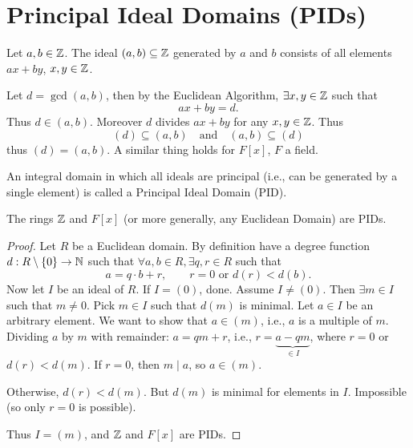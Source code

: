 \documentclass[10pt, a4paper]{article}
\begin{document}
\newpage

\section{Principal Ideal Domains
    (PIDs)}

Let $a, b \in \mathbb{Z}$.
The ideal $(a, b) \subseteq \mathbb{Z}$ generated by $a$ and $b$ consists of all elements $ax + by$,
$x, y \in \mathbb{Z}$.

Let $d = \gcd(a, b)$,
then by the Euclidean Algorithm,
$\exists x, y \in \mathbb{Z}$ such that
\[
ax + by = d.
\]
Thus $d \in (a, b)$.
Moreover $d$ divides $ax + by$ for any $x, y \in \mathbb{Z}$.
Thus
\[
(d) \subseteq (a, b)\quad\text{and}\quad (a, b) \subseteq (d)
\]
thus $(d) = (a, b)$.
A similar thing holds for $F[x]$,
$F$ a field.

\begin{definition}
    An integral domain in which all ideals are principal
    (i.e.,
    can be generated by a single element)
    is called a Principal Ideal Domain
    (PID).
\end{definition}

\begin{theorem}
    The rings $\mathbb{Z}$ and $F[x]$
    (or more generally,
    any Euclidean Domain)
    are PIDs.

    \begin{proof}
        Let $R$ be a Euclidean domain.
        By definition have a degree function $d : R \setminus \{0\} \to \mathbb{N}$ such that $\forall a, b \in R, \exists q, r \in R$ such that
        \[
        a = q\cdot b + r,\qquad r = 0\text{ or } d(r) < d(b).
        \]
        Now let $I$ be an ideal of $R$.
        If $I = (0)$,
        done.
        Assume $I \neq (0)$.
        Then $\exists m \in I$ such that $m \neq 0$.
        Pick $m \in I$ such that $d(m)$ is minimal.
        Let $a \in I$ be an arbitrary element.
        We want to show that $a \in (m)$,
        i.e.,
        $a$ is a multiple of $m$.
        Dividing $a$ by $m$ with remainder:
        $a = qm + r$,
        i.e.,
        $r = \underbrace{a - qm}_{\in I}$,
        where $r = 0$ or $d(r) < d(m)$.
        If $r = 0$,
        then $m \mid a$,
        so $a \in (m)$.
        
        Otherwise,
        $d(r) < d(m)$.
        But $d(m)$ is minimal for elements in $I$.
        Impossible
        (so only $r = 0$ is possible).

        Thus $I = (m)$,
        and $\mathbb{Z}$ and $F[x]$ are PIDs.
    \end{proof}
\end{theorem}
\end{document}
